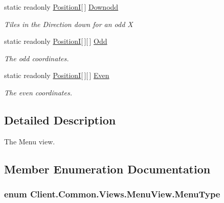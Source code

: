 \begin{DoxyCompactItemize}
static readonly \hyperlink{classCore_1_1Models_1_1PositionI}{Position\+I}\mbox{[}$\,$\mbox{]} \hyperlink{classClient_1_1Common_1_1Views_1_1MenuView_aa734ab342ead18ae0c228040de94bf7b}{Downodd}
\begin{DoxyCompactList}\small\item\em Tiles in the Direction down for an odd X \end{DoxyCompactList}\item 
static readonly \hyperlink{classCore_1_1Models_1_1PositionI}{Position\+I}\mbox{[}$\,$\mbox{]}\mbox{[}$\,$\mbox{]} \hyperlink{classClient_1_1Common_1_1Views_1_1MenuView_a71f02725269d58057f9a0082de655ecb}{Odd}
\begin{DoxyCompactList}\small\item\em The odd coordinates. \end{DoxyCompactList}\item 
static readonly \hyperlink{classCore_1_1Models_1_1PositionI}{Position\+I}\mbox{[}$\,$\mbox{]}\mbox{[}$\,$\mbox{]} \hyperlink{classClient_1_1Common_1_1Views_1_1MenuView_a255305ea63fc1409619cea474f9fec30}{Even}
\begin{DoxyCompactList}\small\item\em The even coordinates. \end{DoxyCompactList}\end{DoxyCompactItemize}


\subsection{Detailed Description}
The Menu view. 



\subsection{Member Enumeration Documentation}
\hypertarget{classClient_1_1Common_1_1Views_1_1MenuView_a63db164d71105de8543e3992db8c9a1c}{}
\subsubsection[{Menu\+Type}]{\setlength{\rightskip}{0pt plus 5cm}enum {\bf Client.\+Common.\+Views.\+Menu\+View.\+Menu\+Type}\hspace{0.3cm}{\ttfamily [strong]}}\label{classClient_1_1Common_1_1Views_1_1MenuView_a63db164d71105de8543e3992db8c9a1c}



